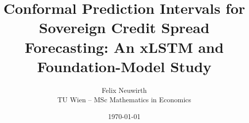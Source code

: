 \documentclass[11pt,a4paper]{article}
\theoremstyle{definition}
\begin{document}
\title{Conformal Prediction Intervals for Sovereign Credit Spread
Forecasting: An xLSTM and Foundation-Model Study}
\author{Felix Neuwirth\\ \small TU Wien -- MSc Mathematics in Economics}
\date{\today}
\maketitle

\begin{abstract}
\end{abstract}

% 
% 









% 
% 



\printbibliography
\end{document}
